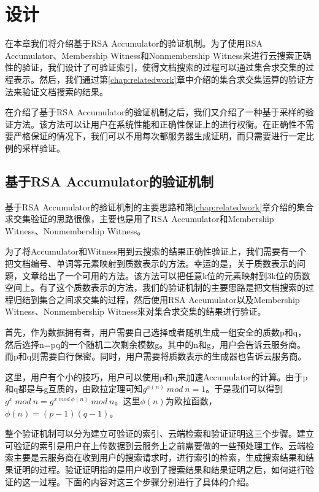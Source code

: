 \chapter{设计}
\label{chap:design}

在本章我们将介绍基于RSA Accumulator的验证机制。为了使用RSA Accumulator、Membership Witness和Nonmembership Witness来进行云搜索正确性的验证，我们设计了可验证索引，使得文档搜索的过程可以通过集合求交集的过程表示。然后，我们通过第\ref{chap:relatedwork}章中介绍的集合求交集运算的验证方法来验证文档搜索的结果。

在介绍了基于RSA Accumulator的验证机制之后，我们又介绍了一种基于采样的验证方法。该方法可以让用户在系统性能和正确性保证上的进行权衡。在正确性不需要严格保证的情况下，我们可以不用每次都服务器生成证明，而只需要进行一定比例的采样验证。

\section{基于RSA Accumulator的验证机制}
基于RSA Accumulator的验证机制的主要思路和第\ref{chap:relatedwork}章介绍的集合求交集验证的思路很像，主要也是用了RSA Accumulator和Membership Witness、Nonmembership Witness。

为了将Accumulator和Witness用到云搜索的结果正确性验证上，我们需要有一个把文档编号、单词等元素映射到质数表示的方法。幸运的是，关于质数表示的问题，文章\cite{gennaro1999secure,goodrich2002efficient}给出了一个可用的方法。该方法可以把任意k位的元素映射到3k位的质数空间上。有了这个质数表示的方法，我们的验证机制的主要思路是把文档搜索的过程归结到集合之间求交集的过程，然后使用RSA Accumulator以及Membership Witness、Nonmembership Witness来对集合求交集的结果进行验证。

首先，作为数据拥有者，用户需要自己选择或者随机生成一组安全的质数p和q，然后选择n=pq的一个随机二次剩余模数g。其中的n和g，用户会告诉云服务商。而p和q则需要自行保密。同时，用户需要将质数表示的生成器也告诉云服务商。

这里，用户有个小的技巧，用户可以使用p和q来加速Accumulator的计算。由于p和q都是与g互质的，由欧拉定理可知$g^{\phi(n)}\ mod\ n = 1$。于是我们可以得到$g^x\ mod\ n  = g^{x\ mod\ \phi(n)}\ mod\ n$。这里$\phi(n)$为欧拉函数，$\phi(n) = (p-1)(q-1)$。

整个验证机制可以分为建立可验证的索引、云端检索和验证证明这三个步骤。建立可验证的索引是用户在上传数据到云服务上之前需要做的一些预处理工作。云端检索主要是云服务商在收到用户的搜索请求时，进行索引的检索，生成搜索结果和结果证明的过程。验证证明指的是用户收到了搜索结果和结果证明之后，如何进行验证的这一过程。下面的内容对这三个步骤分别进行了具体的介绍。

